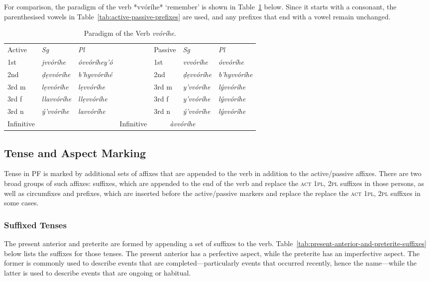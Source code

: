 \documentclass[a4paper, 12pt, oneside, final]{article}
\let \nf \normalfont
\let \s \textsc
\begin{document}
\noindent For comparison, the paradigm of the verb *vvóríhe* ‘remember’ is shown in Table~\ref{tab:vvorihe-paradigm} below.
Since it starts with a consonant, the parenthesised vowels in Table~\ref{tab:active-passive-prefixes} are used, and any
prefixes that end with a vowel remain unchanged.

\begin{table}[h]
\centering
\noindent\begin{tabular}{@{}|>{}l|>{\it}l|>{\it}l|>{}l|>{}l|>{\it}l|>{\it}l|}\cline{1-3}\cline{5-7}
\nf Active&\nf Sg&\nf Pl&\nf &\nf Passive&\nf Sg&\nf Pl\\\cline{1-3}\cline{5-7}
1st&jvvóríhe&óvvóríhey’ó&&1st&vvvóríhe&óvvóríhe\\\cline{1-3}\cline{5-7}
2nd&ḍẹvvóríhe&b’hyvvóríhé&&2nd&ḍẹvvóríhe&b’hyvvóríhe\\\cline{1-3}\cline{5-7}
3rd m&lẹvvóríhe&lẹvvóríhe&&3rd m&y’vvóríhe&lývvóríhe\\\cline{1-3}\cline{5-7}
3rd f&llavvóríhe&llẹvvóríhe&&3rd f&y’vvóríhe&lývvóríhe\\\cline{1-3}\cline{5-7}
3rd n&ý’vvóríhe&lavvóríhe&&3rd n&ý’vvóríhe&lývvóríhe\\\cline{1-3}\cline{5-7}
Infinitive&\multicolumn{2}{c|}{\it dẹvvóríhe}&&Infinitive&\multicolumn{2}{c|}{\it àvvóríhe}\\\cline{1-3}\cline{5-7}
\end{tabular}
\caption{Paradigm of the Verb \emph{vvóríhe}.}\label{tab:vvorihe-paradigm}
\end{table}

\subsection{Tense and Aspect Marking}\label{subsec:tense-and-aspect-marking}
Tense in PF is marked by additional sets of affixes that are appended to the verb in addition to the active/passive affixes.
There are two broad groups of such affixes: suffixes, which are appended to the end of the verb and replace the \s{act 1pl, 2pl} suffixes
in those persons, as well as circumfixes and prefixes, which are inserted before the active/passive markers and replace the
replace the \s{act 1pl, 2pl} suffixes in some cases.


\subsubsection{Suffixed Tenses}
The present anterior and preterite are formed by appending a set of suffixes to the verb. Table~\ref{tab:present-anterior-and-preterite-suffixes}
below lists the suffixes for those tenses. The present anterior has a perfective aspect, while the preterite has an imperfective aspect. The
former is commonly used to describe events that are completed—particularly events that occurred recently, hence the name—while the latter
is used to describe events that are ongoing or habitual.
\end{document}
